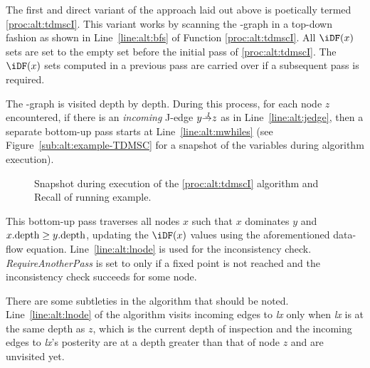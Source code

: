 {The first and direct variant of the approach laid out above is poetically 
termed \ref{proc:alt:tdmscI}.  This variant works by scanning the \DJ-graph in 
a top-down fashion as shown in Line~\ref{line:alt:bfs} of Function 
\ref{proc:alt:tdmscI}.
All $\iDF(x)$ sets are set to the empty set before the initial pass of 
\ref{proc:alt:tdmscI}.  The $\iDF(x)$ sets computed in a previous pass are 
carried over if a subsequent pass is required.

The \DJ-graph is visited depth by depth.
During this process, for each node $z$ encountered, if there is an \emph{incoming} J-edge $y \st{J} z$ as in Line~\ref{line:alt:jedge}, then a separate bottom-up pass starts at Line~\ref{line:alt:mwhiles} (see Figure~\ref{sub:alt:example-TDMSC} for a snapshot of the variables during algorithm execution).

\begin{figure}[b!]
  \hfill

  \caption{\protect{} Snapshot during execution of the \ref{proc:alt:tdmscI} algorithm and \protect{} Recall of running example.}
  \label{fig:alt:example-TDMSC}
\end{figure}



This bottom-up pass traverses all nodes $x$ such that $x$ dominates $y$ and $x.\textrm{depth} \geq y.\textrm{depth}$, updating the $\iDF(x)$ values using the aforementioned data-flow equation. 
Line~\ref{line:alt:lnode} is used for the inconsistency check. 
\textit{RequireAnotherPass} is set to \true only if a fixed point is not reached and the inconsistency check succeeds for some node.

There are some subtleties in the algorithm that should be noted. 
Line~\ref{line:alt:lnode} of the algorithm visits incoming edges to \textit{lx} only when \textit{lx} is at the same depth as $z$, which is the current depth of inspection and the incoming edges to \textit{lx}'s posterity are at a depth greater than that of node $z$ and are unvisited yet.



}
